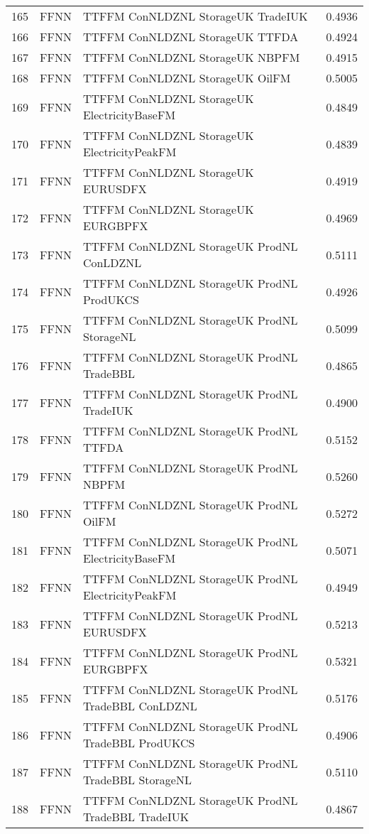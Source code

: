 \begin{table}[ht]
\begin{tabular}{rllr}
  165 & FFNN & TTFFM ConNLDZNL StorageUK TradeIUK & 0.4936 \\ 
  166 & FFNN & TTFFM ConNLDZNL StorageUK TTFDA & 0.4924 \\ 
  167 & FFNN & TTFFM ConNLDZNL StorageUK NBPFM & 0.4915 \\ 
  168 & FFNN & TTFFM ConNLDZNL StorageUK OilFM & 0.5005 \\ 
  169 & FFNN & TTFFM ConNLDZNL StorageUK ElectricityBaseFM & 0.4849 \\ 
  170 & FFNN & TTFFM ConNLDZNL StorageUK ElectricityPeakFM & 0.4839 \\ 
  171 & FFNN & TTFFM ConNLDZNL StorageUK EURUSDFX & 0.4919 \\ 
  172 & FFNN & TTFFM ConNLDZNL StorageUK EURGBPFX & 0.4969 \\ 
  173 & FFNN & TTFFM ConNLDZNL StorageUK ProdNL ConLDZNL & 0.5111 \\ 
  174 & FFNN & TTFFM ConNLDZNL StorageUK ProdNL ProdUKCS & 0.4926 \\ 
  175 & FFNN & TTFFM ConNLDZNL StorageUK ProdNL StorageNL & 0.5099 \\ 
  176 & FFNN & TTFFM ConNLDZNL StorageUK ProdNL TradeBBL & 0.4865 \\ 
  177 & FFNN & TTFFM ConNLDZNL StorageUK ProdNL TradeIUK & 0.4900 \\ 
  178 & FFNN & TTFFM ConNLDZNL StorageUK ProdNL TTFDA & 0.5152 \\ 
  179 & FFNN & TTFFM ConNLDZNL StorageUK ProdNL NBPFM & 0.5260 \\ 
  180 & FFNN & TTFFM ConNLDZNL StorageUK ProdNL OilFM & 0.5272 \\ 
  181 & FFNN & TTFFM ConNLDZNL StorageUK ProdNL ElectricityBaseFM & 0.5071 \\ 
  182 & FFNN & TTFFM ConNLDZNL StorageUK ProdNL ElectricityPeakFM & 0.4949 \\ 
  183 & FFNN & TTFFM ConNLDZNL StorageUK ProdNL EURUSDFX & 0.5213 \\ 
  184 & FFNN & TTFFM ConNLDZNL StorageUK ProdNL EURGBPFX & 0.5321 \\ 
  185 & FFNN & TTFFM ConNLDZNL StorageUK ProdNL TradeBBL ConLDZNL & 0.5176 \\ 
  186 & FFNN & TTFFM ConNLDZNL StorageUK ProdNL TradeBBL ProdUKCS & 0.4906 \\ 
  187 & FFNN & TTFFM ConNLDZNL StorageUK ProdNL TradeBBL StorageNL & 0.5110 \\ 
  188 & FFNN & TTFFM ConNLDZNL StorageUK ProdNL TradeBBL TradeIUK & 0.4867 \\ 

\end{tabular}
\end{table}
